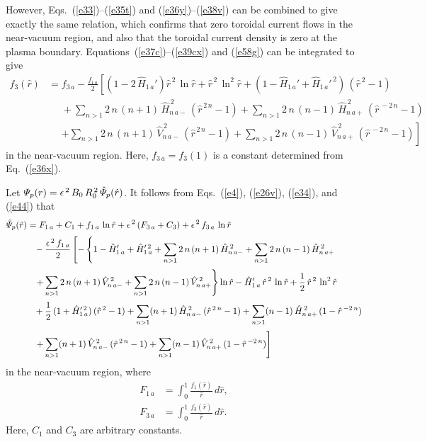 \documentclass[12pt,prb,aps]{revtex4-1}
\begin{document}
However, Eqs.~(\ref{e33})--(\ref{e35t}) and (\ref{e36y})--(\ref{e38v}) can be combined to give exactly the same relation, which confirms that zero toroidal current flows in the near-vacuum
region, and also that the toroidal current density is zero at the plasma boundary.  Equations~(\ref{e37c})--(\ref{e39cx}) and (\ref{e58g}) can be integrated to give
\begin{align}\label{e44}
f_3(\hat{r}) &= f_{3\,a} -\frac{f_{1\,a}}{2}\left[\left(1-2\,\hat{H}_{1\,a}'\right)
\hat{r}^{\,2}\,\ln\hat{r}+\hat{r}^{\,2}\,\ln^2\hat{r}+(1-\hat{H}_{1\,a}'+ \hat{H}_{1\,a}'^{\,2})\,(\hat{r}^{\,2}-1)\right.\nonumber\\[0.5ex]
&\phantom{=} +\sum_{n>1}2\,n\,(n+1)\,\hat{H}_{n\,a-}^{\,2}\,(\hat{r}^{\,2\,n}-1)+\sum_{n>1}2\,n\,(n-1)\,\hat{H}_{n\,a+}^{\,2}\,(\hat{r}^{\,-2\,n}-1)\nonumber\\[0.5ex]
&\phantom{=}\left.+\sum_{n>1}2\,n\,(n+1)\,\hat{V}_{n\,a-}^{\,2}\,(\hat{r}^{\,2\,n}-1)+\sum_{n>1}2\,n\,(n-1)\,\hat{V}_{n\,a+}^{\,2}\,(\hat{r}^{\,-2\,n}-1)
\right]
\end{align}
in the near-vacuum region. Here, $f_{3\,a}=f_3(1)$ is a constant determined from Eq.~(\ref{e36x}). 

Let ${\mit\Psi}_p(r)= \epsilon^{\,2}\,B_0\,R_0^{\,2}\,\hat{\mit\Psi}_p(\hat{r})$. It follows from Eqs.~(\ref{e4}), (\ref{e26v}), (\ref{e34}),  and (\ref{e44}) that
\begin{align}
\hat{\mit\Psi}_p(\hat{r}) &=F_{1\,a} + C_1+f_{1\,a}\,\ln\hat{r}+\epsilon^{\,2}\,(F_{3\,a}+C_3) + \epsilon^{\,2}\,f_{3\,a}\,\ln\hat{r}
\nonumber\\[0.5ex]
&\phantom{=}-\frac{\epsilon^{\,2}\,f_{1\,a}}{2}\left[-\left\{1-\hat{H}_{1\,a}'+\hat{H}_{1\,a}'^{\,2}
+\sum_{n>1}2\,n\,(n+1)\,\hat{H}_{n\,a-}^{\,2} + \sum_{n>1}2\,n\,(n-1)\,\hat{H}_{n\,a+}^{\,2}\,\right.\right.\nonumber\\[0.5ex]
&\phantom{=}\left.+\sum_{n>1}2\,n\,(n+1)\,\hat{V}_{n\,a-}^{\,2} + \sum_{n>1}2\,n\,(n-1)\,\hat{V}_{n\,a+}^{\,2}\right\}\ln\hat{r}
-\hat{H}_{1\,a}'\,\hat{r}^{\,2}\,\ln\hat{r} + \frac{1}{2}\,\hat{r}^{\,2}\,\ln^2\hat{r}\nonumber\\[0.5ex]
&\phantom{=}+\frac{1}{2}\,(1+\hat{H}_{1\,a}'^{\,2})\,(\hat{r}^{\,2}-1)+ \sum_{n>1}(n+1)\,\hat{H}_{n\,a-}^{\,2}\,(\hat{r}^{\,2\,n}-1)+ \sum_{n>1}(n-1)\,\hat{H}_{n\,a+}^{\,2}\,(1-\hat{r}^{\,-2\,n})\nonumber\\[0.5ex]&\phantom{=}\left.+\sum_{n>1}(n+1)\,\hat{V}_{n\,a-}^{\,2}\,(\hat{r}^{\,2\,n}-1)+ \sum_{n>1}(n-1)\,\hat{V}_{n\,a+}^{\,2}\,(1-\hat{r}^{\,-2\,n})\right]\label{e51t}
\end{align}
in the near-vacuum region, 
where
\begin{align}
F_{1\,a}&=\int_0^1\frac{f_1(\hat{r})}{\hat{r}}\,d\hat{r} ,\\[0.5ex]
F_{3\,a} &=\int_0^1\frac{f_3(\hat{r})}{\hat{r}}\,d\hat{r}.
\end{align}
Here, $C_1$ and $C_3$ are arbitrary constants. 
\end{document}
